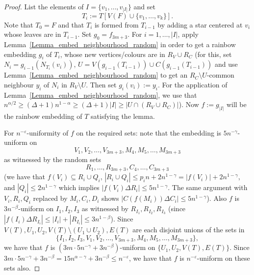 \documentclass[a4paper,11pt,hidelinks]{amsart}
\theoremstyle{definition}
\begin{document}
\begin{proof}
List the elements of $I=\{v_1, \dots, v_{|I|}\}$ and set $$T_i:=T[V(F)\cup \{v_1, \dots, v_k\}].$$ Note that $T_0=F$ and that $T_{i}$ is formed from $T_{i-1}$ by adding a star centered at $v_i$ whose leaves are in $T_{i -1}$. Set $g_0=f_{3m+3}$. For $i=1, \dots, |I|$, apply Lemma~\ref{Lemma_embed_neighbourhood_random} in order to get a rainbow embedding $g_{i}$ of $T_i$, whose new vertices/colours are in $R_V\cup R_C$ (for this, set $N_i=g_{i-1}(N_{T_i}(v_i))$, $U=V(g_{i-1}(T_{i-1}))\cup C(g_{i-1}(T_{i-1}))$ and use Lemma~\ref{Lemma_embed_neighbourhood_random} to get an $R_C\setminus U$-common neighbour $y_i$ of $N_i$  in $R_V\setminus U$. Then set $g_{i}(v_i):=y_i$. For the application of Lemma~\ref{Lemma_embed_neighbourhood_random}, we use that $n^{\alpha/2}\geq (\Delta +1)n^{1-\alpha} \geq  (\Delta+1) |I|\geq |U\cap (R_V\cup R_C)|$). Now $f:=g_{|I|}$ will be the rainbow embedding of $T$ satisfying the lemma.

For $n^{-\varepsilon}$-uniformity of $f$ on the required sets: note that the embedding is $5n^{-\gamma}$-uniform on $$V_1, V_2, \dots, V_{3m+3}, M_4, M_5, \dots, M_{3m+3}$$ as witnessed by the random sets $$R_1, \dots, R_{3m+3}, C_4, \dots, C_{3m+3}$$ (we have that $f(V_i)\subseteq R_i\cup Q_i$, $|R_i\cup Q_i|\leq p_in+ 2n^{1-\gamma}=|f(V_i)|+ 2n^{1-\gamma}$, and $|Q_i|\leq 2n^{1-\gamma}$ which implies $|f(V_i)\Delta R_i|\leq 5n^{1-\gamma}$. The same argument with $V_i, R_i, Q_i$ replaced by $M_i, C_i, D_i$ shows $|C(f(M_i))\Delta C_i|\leq 5n^{1-\gamma}$). 
Also $f$ is $3n^{-\beta}$-uniform on $I_1, I_2, I_3$ as witnessed by $R_{I_1}, R_{I_2}, R_{I_3}$ (since $|f(I_i)\Delta R_{I_i}|\leq |I_i|+|R_{I_i}|\leq 3n^{1-\beta}$).
Since $V(T),U_1, U_2,  V(T)\setminus (U_1\cup U_2), E(T)$ are each disjoint unions of the sets in  $$\{I_1, I_2, I_3, V_1, V_2, \dots, V_{3m+3}, M_4, M_5, \dots, M_{3m+3}\},$$ we have that $f$ is $(3m\cdot 5n^{-\gamma}+3n^{-\beta})$-uniform on $\{U_1, U_2,  V(T), E(T)\}$. Since  $3m\cdot 5n^{-\gamma}+3n^{-\beta}=15n^{\alpha-\gamma}+3n^{-\beta}\leq n^{-\varepsilon}$, we have that $f$ is  $n^{-\varepsilon}$-uniform on these sets also.
\end{proof}
\vspace{15mm}
\end{document}
